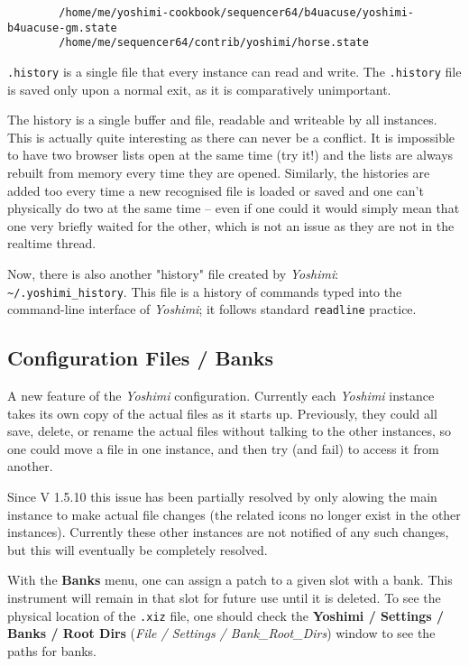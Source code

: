    \begin{verbatim}
		/home/me/yoshimi-cookbook/sequencer64/b4uacuse/yoshimi-b4uacuse-gm.state
		/home/me/sequencer64/contrib/yoshimi/horse.state
   \end{verbatim}

   \texttt{.history} is a single file that every instance can read and write.
   The \texttt{.history} file is saved only upon a normal exit, as it is
   comparatively unimportant.

   The history is a single buffer and file, readable and writeable by all
   instances. This is actually quite interesting as there can never be a
   conflict.  It is impossible to have two browser lists open at the same time
   (try it!) and the lists are always rebuilt from memory every time they are
   opened. Similarly, the histories are added too every time a new recognised
   file is loaded or saved and one can't physically do two at the same time --
   even if one could it would simply mean that one very briefly waited for the
   other, which is not an issue as they are not in the realtime thread.

   Now, there is also another "history" file created by
   \textsl{Yoshimi}: \texttt{\textasciitilde/.yoshimi\_history}.
   This file is a history of commands typed into the command-line
   interface of \textsl{Yoshimi}; it follows standard
   \texttt{readline} practice.

\subsection{Configuration Files / Banks}
\label{subsec:configuration_banks}

   A new feature of the \textsl{Yoshimi} configuration.  Currently each
   \textsl{Yoshimi} instance takes its own copy of the actual files as it starts
   up.  Previously, they could all save, delete, or rename the actual files without
   talking to the other instances, so one could move a file in one instance, and
   then try (and fail) to access it from another.

   Since V 1.5.10 this issue has been partially resolved by only alowing the main instance to make actual file changes (the related icons no longer exist in the
   other instances). Currently these other instances are not notified of any
   such changes, but this will eventually be completely resolved.

   With the \textbf{Banks} menu, one can assign a patch to a given slot with
   a bank.  This instrument will remain in that slot for future use until it is
   deleted. To see the physical location of the \texttt{.xiz} file, one
   should check the
   \textbf{Yoshimi / Settings / Banks / Root Dirs}
   (\textsl{File / Settings / Bank\_Root\_Dirs}) window to see the paths for
   banks.

